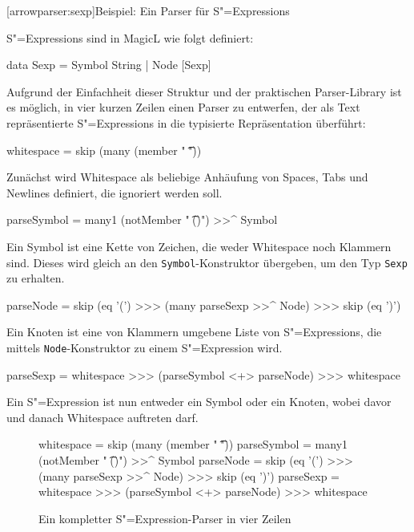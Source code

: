 \documentclass[11pt, a4paper, bibgerm]{scrbook}
\newenvironment{DIFnomarkup}{}{}
\newcommand\icode[1]{\lstinline?#1?}
\newcommand\lsection{}
\newcommand{\sexp}{S"=Expression}
\newcommand{\sexps}{S"=Expressions}
\begin{document}
\lsection[arrowparser:sexp]{Beispiel: Ein Parser für \sexps{}}

\sexps{} sind in MagicL wie folgt definiert:
\begin{DIFnomarkup}\begin{code}
data Sexp = Symbol String
          | Node [Sexp]
\end{code}\end{DIFnomarkup}

Aufgrund der Einfachheit dieser Struktur und der praktischen
Parser-Library ist es möglich, in vier kurzen Zeilen einen Parser zu
entwerfen, der als Text repräsentierte \sexps{} in die typisierte
Repräsentation überführt:

\begin{DIFnomarkup}\begin{code}
whitespace = skip (many (member " \t\n"))
\end{code}\end{DIFnomarkup}
Zunächst wird Whitespace als beliebige Anhäufung von Spaces, Tabs und
Newlines definiert, die ignoriert werden soll.
\begin{DIFnomarkup}\begin{code}
parseSymbol = many1 (notMember " \t\n()") >>^ Symbol
\end{code}\end{DIFnomarkup} %
Ein Symbol ist eine Kette von Zeichen, die weder Whitespace noch
Klammern sind. Dieses wird gleich an den \icode{Symbol}-Konstruktor
übergeben, um den Typ \icode{Sexp} zu erhalten.
\begin{DIFnomarkup}\begin{code}
parseNode = skip (eq '(') >>> (many parseSexp >>^ Node) >>> skip (eq ')')
\end{code}\end{DIFnomarkup} %
Ein Knoten ist eine von Klammern umgebene Liste von \sexps{}, die
mittels \icode{Node}-Konstruktor zu einem \sexp{} wird.
\begin{DIFnomarkup}\begin{code}
parseSexp = whitespace >>> (parseSymbol <+> parseNode) >>> whitespace
\end{code}\end{DIFnomarkup} %
Ein \sexp{} ist nun entweder ein Symbol oder ein Knoten, wobei davor und
danach Whitespace auftreten darf.

\begin{figure}[h]
\begin{DIFnomarkup}\begin{code}
whitespace  = skip (many (member " \t\n"))
parseSymbol = many1 (notMember " \t\n()") >>^ Symbol
parseNode   = skip (eq '(') >>> (many parseSexp >>^ Node) >>> skip (eq ')')
parseSexp   = whitespace >>> (parseSymbol <+> parseNode) >>> whitespace    
  \end{code}\end{DIFnomarkup}
  \caption{Ein kompletter \sexp{}-Parser in vier Zeilen}
  \label{magicl:fig:sexp_parser}
\end{figure}
\end{document}
